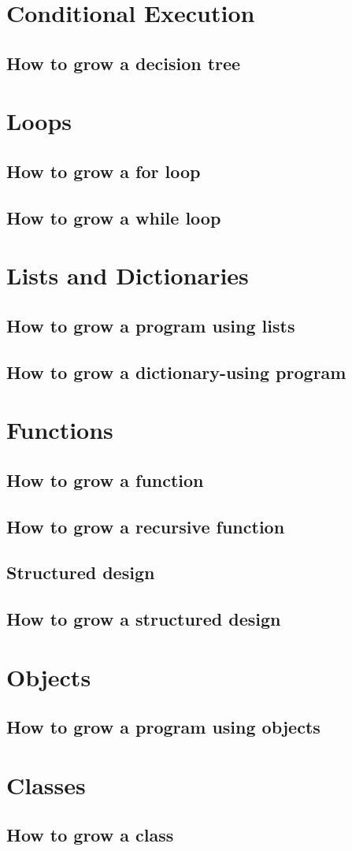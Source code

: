 \documentclass{book}
\begin{document}
\chapter{Conditional Execution}
\section{How to grow a decision tree}

\chapter{Loops}
\section{How to grow a for loop}
\section{How to grow a while loop}

\chapter{Lists and Dictionaries}
\section{How to grow a program using lists}
\section{How to grow a dictionary-using program}

\chapter{Functions}
\section{How to grow a function}
\section{How to grow a recursive function}
\section{Structured design}
\section{How to grow a structured design}

\chapter{Objects}
\section{How to grow a program using objects}

\chapter{Classes}
\section{How to grow a class}
\end{document}
